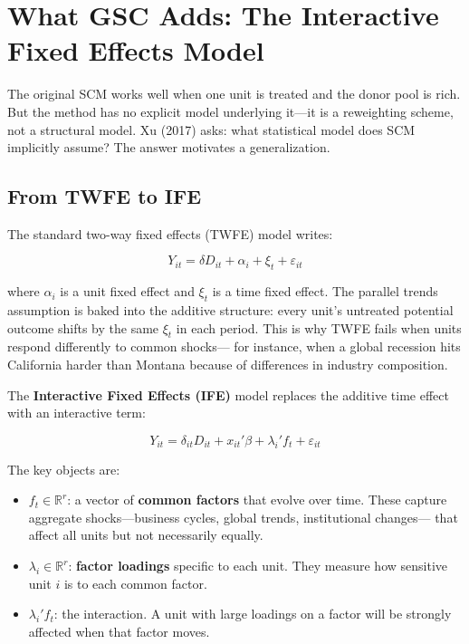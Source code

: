 \documentclass[12pt]{article}
\begin{document}
\section{What GSC Adds: The Interactive Fixed Effects Model}

The original SCM works well when one unit is treated and the donor pool is rich.
But the method has no explicit model underlying it---it is a reweighting scheme,
not a structural model.
Xu (2017) asks: what statistical model does SCM implicitly assume?
The answer motivates a generalization.

\subsection{From TWFE to IFE}

The standard two-way fixed effects (TWFE) model writes:

\begin{equation}
  Y_{it} = \delta D_{it} + \alpha_i + \xi_t + \varepsilon_{it}
\end{equation}

where $\alpha_i$ is a unit fixed effect and $\xi_t$ is a time fixed effect.
The parallel trends assumption is baked into the additive structure:
every unit's untreated potential outcome shifts by the same $\xi_t$ in each period.
This is why TWFE fails when units respond differently to common shocks---
for instance, when a global recession hits California harder than Montana
because of differences in industry composition.

The \textbf{Interactive Fixed Effects (IFE)} model replaces the additive time effect
with an interactive term:

\begin{equation}
  Y_{it} = \delta_{it} D_{it} + x_{it}'\beta + \lambda_i' f_t + \varepsilon_{it}
\end{equation}

The key objects are:
\begin{itemize}
  \item $f_t \in \mathbb{R}^r$: a vector of \textbf{common factors} that evolve over time.
    These capture aggregate shocks---business cycles, global trends, institutional changes---
    that affect all units but not necessarily equally.
  \item $\lambda_i \in \mathbb{R}^r$: \textbf{factor loadings} specific to each unit.
    They measure how sensitive unit $i$ is to each common factor.
  \item $\lambda_i' f_t$: the interaction. A unit with large loadings on a factor
    will be strongly affected when that factor moves.
\end{itemize}
\end{document}
